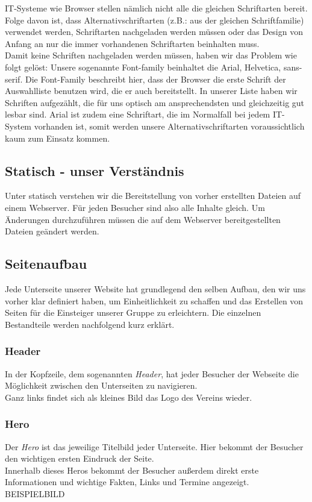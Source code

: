 \documentclass[12pt,a4paper]{article}
\begin{document}
 IT-Systeme wie Browser stellen nämlich nicht alle die gleichen Schriftarten bereit. Folge davon ist, dass Alternativschriftarten (z.B.: aus der gleichen Schriftfamilie) verwendet werden, Schriftarten nachgeladen werden müssen oder das Design von Anfang an nur die immer vorhandenen Schriftarten beinhalten muss.\\
Damit keine Schriften nachgeladen werden müssen, haben wir das Problem wie folgt gelöst: Unsere sogenannte Font-family beinhaltet die Arial, Helvetica, sans-serif.  Die Font-Family beschreibt hier, dass der Browser die erste Schrift der Auswahlliste benutzen wird, die er auch bereitstellt. In unserer Liste haben wir Schriften aufgezählt, die für uns optisch am ansprechendsten und gleichzeitig
gut lesbar sind. Arial ist zudem eine Schriftart, die im Normalfall bei jedem IT-System vorhanden ist, somit werden unsere Alternativschriftarten voraussichtlich kaum zum Einsatz kommen.

\subsection{Statisch - unser Verständnis}
Unter statisch verstehen wir die Bereitstellung von vorher erstellten Dateien auf einem Webserver. Für jeden Besucher sind also alle Inhalte gleich. Um Änderungen durchzuführen müssen die auf dem Webserver bereitgestellten Dateien geändert werden.
\subsection{Seitenaufbau}
Jede Unterseite unserer Website hat grundlegend den selben Aufbau, den wir uns vorher klar definiert haben, um Einheitlichkeit zu schaffen und das Erstellen von Seiten für die Einsteiger unserer Gruppe zu erleichtern. Die einzelnen Bestandteile werden nachfolgend kurz erklärt.
\subsubsection{Header}
In der Kopfzeile, dem sogenannten \textit{Header}, hat jeder Besucher der Webseite die Möglichkeit zwischen den Unterseiten zu navigieren.\\
Ganz links findet sich als kleines Bild das Logo des Vereins wieder.
\subsubsection{Hero}
Der \textit{Hero} ist das jeweilige Titelbild jeder Unterseite. Hier bekommt der Besucher den wichtigen ersten Eindruck der Seite.\\
Innerhalb dieses Heros bekommt der Besucher außerdem direkt erste Informationen und wichtige Fakten, Links und Termine angezeigt.\\
BEISPIELBILD
\end{document}
